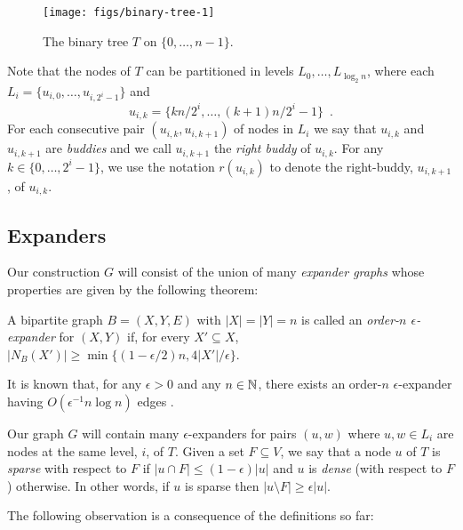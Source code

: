 \documentclass{patmorin}
\begin{document}
\begin{figure}
  \begin{center}
   \texttt{[image: figs/binary-tree-1]}
  \end{center}
  \caption{The binary tree $T$ on $\{0,\ldots,n-1\}$.}
\end{figure}

Note that the nodes of $T$ can be partitioned in levels $L_0,\ldots,L_{\log_2 n}$, where each $L_i=\{u_{i,0},\ldots,u_{i,2^i-1}\}$ and
\[
	u_{i,k} = \{kn/2^i,\ldots,(k+1)n/2^{i}-1\} \enspace .
\]
For each consecutive pair $(u_{i,k},u_{i,k+1})$ of nodes in $L_i$ we say
that $u_{i,k}$ and $u_{i,k+1}$ are \emph{buddies} and we call $u_{i,k+1}$
the \emph{right buddy} of $u_{i,k}$.  For any $k\in\{0,\ldots,2^{i}-1\}$,
we use the notation $r(u_{i,k})$ to denote the right-buddy, $u_{i,k+1}$,
of $u_{i,k}$.

\subsection{Expanders}

Our construction $G$ will consist of the union of many \emph{expander graphs} whose properties are given by the following theorem:

\begin{defn}
   A bipartite graph $B=(X,Y,E)$ with $|X|=|Y|=n$ is called
   an \emph{order-$n$ $\epsilon$-expander} for $(X,Y)$ if, for
   every $X'\subseteq X$, $|N_B(X')| \ge \min\{(1-\epsilon/2)n,
   4|X'|/\epsilon\}$.
\end{defn}

It is known that, for any $\epsilon >0$ and any $n\in\mathbb{N}$, there exists
an order-$n$ $\epsilon$-expander having $O(\epsilon^{-1}n\log n)$
edges \cite{X}.

Our graph $G$ will contain many $\epsilon$-expanders for pairs $(u,w)$
where $u,w\in L_i$ are nodes at the same level, $i$, of $T$.  Given a
set $F\subseteq V$, we say that a node $u$ of $T$ is \emph{sparse}
with respect to $F$ if $|u\cap F| \le (1-\epsilon)|u|$ and $u$ is
\emph{dense} (with respect to $F$) otherwise.  In other words, if $u$
is sparse then $|u\setminus F| \ge \epsilon |u|$.

The following observation is a consequence of the definitions so far:
\end{document}

